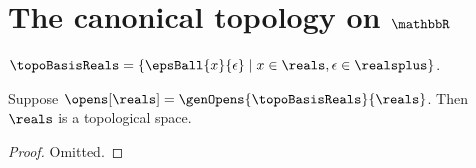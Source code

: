 












\section{The canonical topology on $\mathbbR$}

\begin{definition}\label{topological_basis_reals_eps_ball}
    $\topoBasisReals = \{ \epsBall{x}{\epsilon} \mid x \in \reals, \epsilon \in \realsplus\}$.
\end{definition}

\begin{theorem}\label{reals_as_topo_space}
    Suppose $\opens[\reals] = \genOpens{\topoBasisReals}{\reals}$.
    Then $\reals$ is a topological space.
\end{theorem}
\begin{proof}
    Omitted.
\end{proof}